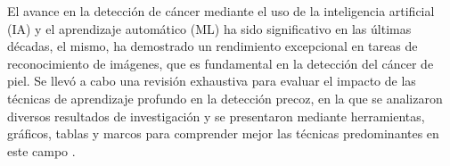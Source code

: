 El avance en la detección de cáncer mediante el uso de la inteligencia artificial (IA) y el aprendizaje automático (ML) ha sido significativo en 
las últimas décadas, el mismo, ha demostrado un rendimiento excepcional en tareas de reconocimiento de imágenes, que es fundamental en la detección 
del cáncer de piel. Se llevó a cabo una revisión exhaustiva para evaluar el impacto de las técnicas de aprendizaje profundo en la detección precoz, 
en la que se analizaron diversos resultados de investigación y se presentaron mediante herramientas, gráficos, tablas y marcos para comprender mejor 
las técnicas predominantes en este campo .







